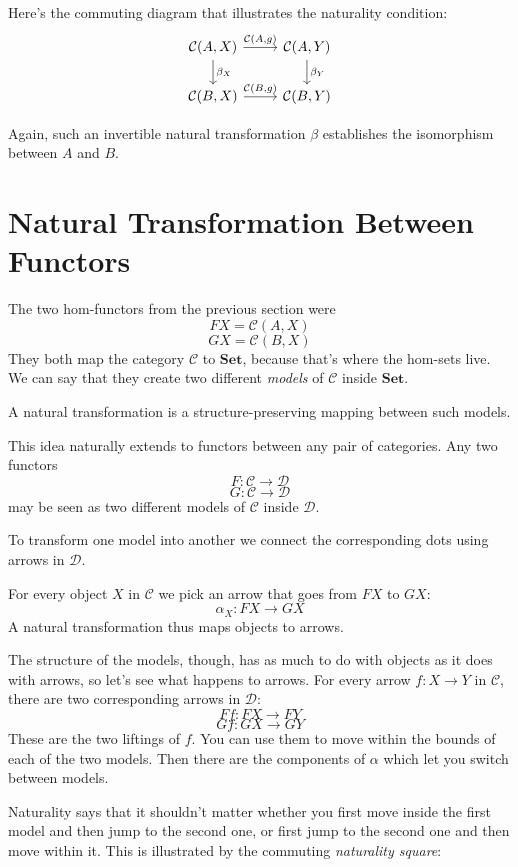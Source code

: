\documentclass[DaoFP]{subfiles}
\begin{document}
Here's the commuting diagram that illustrates the naturality condition:
\[
 \begin{tikzcd}
 \mathcal{C}(A, X)
 \arrow[d, "\beta_X"]
 \arrow[r, "{\mathcal{C}(A, g)}"]
 &
 \mathcal{C}(A, Y)
  \arrow[d, "\beta_Y"]
 \\
 \mathcal{C}(B, X)
 \arrow[r, "{\mathcal{C}(B, g)}"]
& \mathcal{C}(B, Y)
 \end{tikzcd}
\]

Again, such an invertible natural transformation $\beta$ establishes the isomorphism between $A$ and $B$.

\section{Natural Transformation Between Functors}

The two hom-functors from the previous section were
\[ F X =   \mathcal{C}(A, X)\]
\[ G X =   \mathcal{C}(B, X)\]
They both map the category $\mathcal{C}$ to  $\mathbf{Set}$, because that's where the hom-sets live. We can say that they create two different \emph{models} of $\mathcal{C}$ inside $\mathbf{Set}$. 

A natural transformation is a structure-preserving mapping between such models. 

This idea naturally extends to functors between any pair of categories. Any two functors
\[ F \colon \mathcal{C} \to \mathcal{D} \]
\[ G \colon \mathcal{C} \to \mathcal{D} \]
may be seen as two different models of $\mathcal{C}$ inside $\mathcal{D}$. 

To transform one model into another we connect the corresponding dots using arrows in $\mathcal{D}$. 

For every object $X$ in $\mathcal{C}$ we pick an arrow that goes from $F X$ to $G X$:
\[ \alpha_X \colon F X \to G X \]
A natural transformation thus maps objects to arrows.

The structure of the models, though, has as much to do with objects as it does with arrows, so let's see what happens to arrows. For every arrow $f \colon X \to Y$ in $\mathcal{C}$, there are two corresponding arrows in $\mathcal{D}$:
\[ F f \colon F X \to F Y\]
\[ G f \colon G X \to G Y \]
These are the two liftings of $f$. You can use them to move within the bounds of each of the two models. Then there are the components of $\alpha$ which let you switch between models. 

Naturality says that it shouldn't matter whether you first move inside the first model and then jump to the second one, or first jump to the second one and then move within it. This is illustrated by the commuting \emph{naturality square}:
\end{document}
